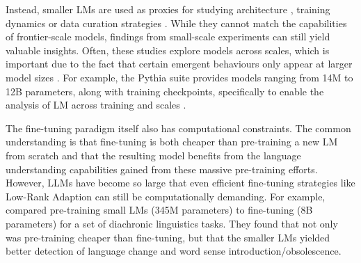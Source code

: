 Instead, smaller LMs are used as proxies for studying architecture \citep{charpentier2024gpt}, training dynamics \citep{martinez2024tending} or data curation strategies \citep{huebner-etal-2021-babyberta}. While they cannot match the capabilities of frontier-scale models, findings from small-scale experiments can still yield valuable insights. Often, these studies explore models across scales, which is important due to the fact that certain emergent behaviours only appear at larger model sizes \citep{wei2022emergent, ganguli2022predictability}. For example, the Pythia suite provides models ranging from 14M to 12B parameters, along with training checkpoints, specifically to enable the analysis of LM across training and scales \citep{biderman2023pythia}.

The fine-tuning paradigm itself also has computational constraints. The common understanding is that fine-tuning is both cheaper than pre-training a new LM from scratch and that the resulting model benefits from the language understanding capabilities gained from these massive pre-training efforts. However, LLMs have become so large that even efficient fine-tuning strategies like Low-Rank Adaption \citep[LoRA;][]{hu2022lora} can still be computationally demanding. For example, \citet{fittschen2025pretraininglanguagemodelsdiachronic} compared pre-training small LMs (345M parameters) to fine-tuning  (8B parameters) for a set of diachronic linguistics tasks. They found that not only was pre-training cheaper than fine-tuning, but that the smaller LMs yielded better detection of language change and word sense introduction/obsolescence. 


